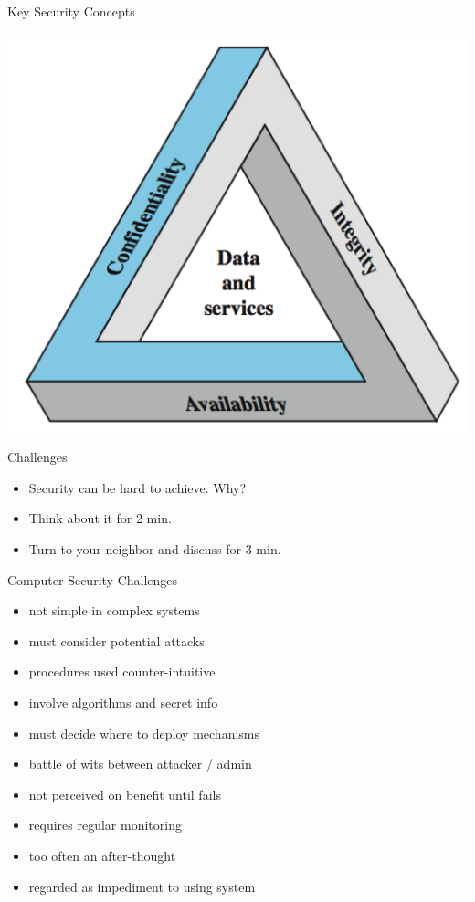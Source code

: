 \documentclass{beamer}
\begin{document}
\begin{frame}{Key Security Concepts}
  \begin{center}
    \includegraphics[width=0.7\linewidth]{concepts}
  \end{center}
\end{frame}

\begin{frame}{Challenges}
  \begin{itemize}
  \item Security can be hard to achieve. Why? 
  \item Think about it for 2 min. 
  \item Turn to your neighbor and discuss for 3 min.
  \end{itemize}
\end{frame}
 
\begin{frame}{Computer Security Challenges}
  \begin{itemize}
\item not simple in complex systems 
\item must consider potential attacks 
\item procedures used counter-intuitive 
\item involve algorithms and secret info 
\item must decide where to deploy mechanisms 
\item battle of wits between attacker / admin 
\item not perceived on benefit until fails 
\item requires regular monitoring 
\item too often an after-thought 
\item regarded as impediment to using system
  \end{itemize}
\end{frame}
\end{document}
